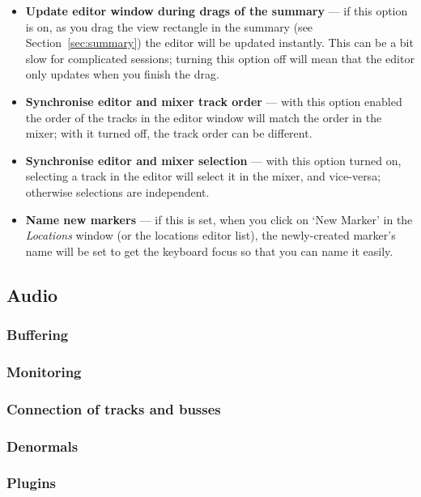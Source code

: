 \documentclass[10pt,a4paper]{book}
\newcommand{\todo}[1]{\marginpar{\small\texttt{#1}}}
\begin{document}
{\begin{itemize}
  draw the trim bar of each region using the same colour as has been
  assigned to its track. \todo{if not?}
\item \textbf{Update editor window during drags of the summary} --- if
  this option is on, as you drag the view rectangle in the summary
  (see Section~\ref{sec:summary}) the editor will be updated
  instantly.  This can be a bit slow for complicated sessions; turning
  this option off will mean that the editor only updates when you
  finish the drag.
\item \textbf{Synchronise editor and mixer track order} --- with this
  option enabled the order of the tracks in the editor window will
  match the order in the mixer; with it turned off, the track order
  can be different.
\item \textbf{Synchronise editor and mixer selection} --- with this
  option turned on, selecting a track in the editor will select it in
  the mixer, and vice-versa; otherwise selections are independent.
\item \textbf{Name new markers} --- if this is set, when you click on
  `New Marker' in the \emph{Locations} window (or the locations editor
  list), the newly-created marker's name will be set to get the
  keyboard focus so that you can name it easily.
\end{itemize}

\subsection{Audio}

\subsubsection{Buffering}

\subsubsection{Monitoring}

\subsubsection{Connection of tracks and busses}

\subsubsection{Denormals}

\subsubsection{Plugins}


}
\end{document}
